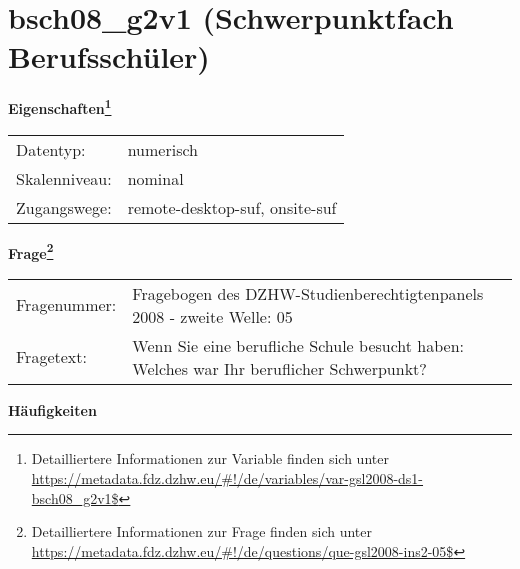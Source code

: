 
    \setcounter{footnote}{0}

    \vspace*{-1.8cm}
	\section{bsch08\_g2v1 (Schwerpunktfach Berufsschüler)}
	\label{section:bsch08_g2v1}



    \vspace*{0.5cm}
    \noindent\textbf{Eigenschaften\footnote{Detailliertere Informationen zur Variable finden sich unter
		\url{https://metadata.fdz.dzhw.eu/\#!/de/variables/var-gsl2008-ds1-bsch08_g2v1$}}}\\
	\begin{tabularx}{\hsize}{@{}lX}
	Datentyp: & numerisch \\
	Skalenniveau: & nominal \\
	Zugangswege: &
	  remote-desktop-suf, 
	  onsite-suf
 \\
    \end{tabularx}



				\vspace*{0.5cm}
                \noindent\textbf{Frage\footnote{Detailliertere Informationen zur Frage finden sich unter
		              \url{https://metadata.fdz.dzhw.eu/\#!/de/questions/que-gsl2008-ins2-05$}}}\\
				\begin{tabularx}{\hsize}{@{}lX}
					Fragenummer: &
					  Fragebogen des DZHW-Studienberechtigtenpanels 2008 - zweite Welle:
					  05
 \\
					Fragetext: & Wenn Sie eine berufliche Schule besucht haben: Welches war Ihr beruflicher Schwerpunkt? \\
				\end{tabularx}





        		\vspace*{0.5cm}
                \noindent\textbf{Häufigkeiten}

